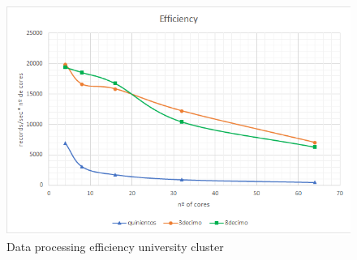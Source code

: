 \begin{figure}[htp!]
	\centering
	\caption{Data processing efficiency university cluster}
	\label{epu}
	\vspace{5pt}
	\includegraphics[scale=0.85]{geng/epu}
\end{figure}


